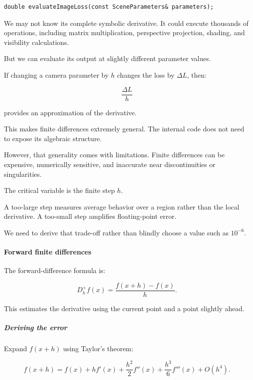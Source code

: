 \begin{verbatim}
double evaluateImageLoss(const SceneParameters& parameters);
\end{verbatim}

We may not know its complete symbolic derivative. It could execute thousands of operations, including matrix multiplication, perspective projection, shading, and visibility calculations.

But we can evaluate its output at slightly different parameter values.

If changing a camera parameter by \(h\) changes the loss by \(\Delta L\), then:

\[
\frac{\Delta L}{h}
\]

provides an approximation of the derivative.

This makes finite differences extremely general. The internal code does not need to expose its algebraic structure.

However, that generality comes with limitations. Finite differences can be expensive, numerically sensitive, and inaccurate near discontinuities or singularities.

The critical variable is the finite step \(h\).

A too-large step measures average behavior over a region rather than the local derivative. A too-small step amplifies floating-point error.

We need to derive that trade-off rather than blindly choose a value such as \(10^{-6}\).

\paragraph{Forward finite differences}\label{02-foundations-ii-ch025-forward-finite-differences}

\hypertarget{02-foundations-ii-ch025-forward-finite-differences}{}

The forward-difference formula is:

\[
\boxed{ D_h^+f(x)=\frac{f(x+h)-f(x)}h }.
\]

This estimates the derivative using the current point and a point slightly ahead.

\subparagraph{Deriving the error}\label{02-foundations-ii-ch025-deriving-the-error}

\hypertarget{02-foundations-ii-ch025-deriving-the-error}{}

Expand \(f(x+h)\) using Taylor's theorem:

\[
f(x+h) = f(x)+hf'(x)+ \frac{h^2}{2}f''(x)+ \frac{h^3}{6}f'''(x)+O(h^4).
\]


